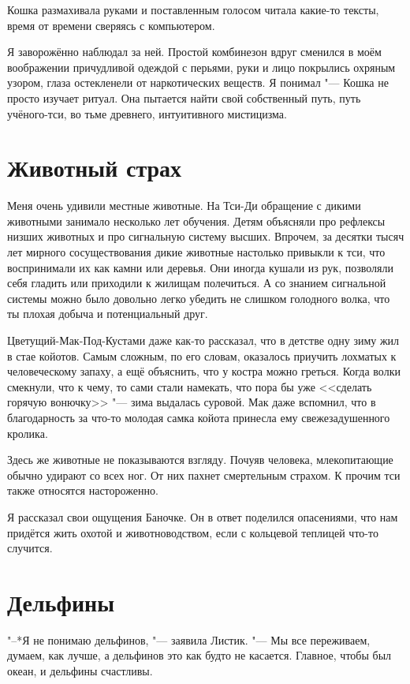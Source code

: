 Кошка размахивала руками и поставленным голосом читала какие-то тексты, время от времени сверяясь с компьютером.

Я заворожённо наблюдал за ней.
Простой комбинезон вдруг сменился в моём воображении причудливой одеждой с перьями, руки и лицо покрылись охряным узором, глаза остекленели от наркотических веществ.
Я понимал "--- Кошка не просто изучает ритуал.
Она пытается найти свой собственный путь, путь учёного-тси, во тьме древнего, интуитивного мистицизма.

\section{Животный страх}

Меня очень удивили местные животные.
На Тси-Ди обращение с дикими животными занимало несколько лет обучения.
Детям объясняли про рефлексы низших животных и про сигнальную систему высших.
Впрочем, за десятки тысяч лет мирного сосуществования дикие животные настолько привыкли к тси, что воспринимали их как камни или деревья.
Они иногда кушали из рук, позволяли себя гладить или приходили к жилищам полечиться.
А со знанием сигнальной системы можно было довольно легко убедить не слишком голодного волка, что ты плохая добыча и потенциальный друг.

Цветущий-Мак-Под-Кустами даже как-то рассказал, что в детстве одну зиму жил в стае койотов.
Самым сложным, по его словам, оказалось приучить лохматых к человеческому запаху, а ещё объяснить, что у костра можно греться.
Когда волки смекнули, что к чему, то сами стали намекать, что пора бы уже <<сделать горячую вонючку>> "--- зима выдалась суровой.
Мак даже вспомнил, что в благодарность за что-то молодая самка койота принесла ему свежезадушенного кролика.

Здесь же животные не показываются взгляду.
Почуяв человека, млекопитающие обычно удирают со всех ног.
От них пахнет смертельным страхом.
К прочим тси также относятся настороженно.

Я рассказал свои ощущения Баночке.
Он в ответ поделился опасениями, что нам придётся жить охотой и животноводством, если с кольцевой теплицей что-то случится.

\section{Дельфины}

"--*Я не понимаю дельфинов, "--- заявила Листик.
"--- Мы все переживаем, думаем, как лучше, а дельфинов это как будто не касается.
Главное, чтобы был океан, и дельфины счастливы.

